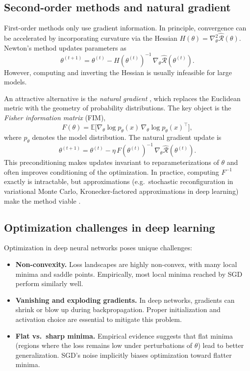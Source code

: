 \subsection{Second-order methods and natural gradient}
First-order methods only use gradient information. In principle, convergence can be 
accelerated by incorporating curvature via the Hessian 
$H(\theta)=\nabla^2_\theta \hat{\mathcal{R}}(\theta)$.  
Newton’s method updates parameters as
\begin{equation}
  \theta^{(t+1)} = \theta^{(t)} - H(\theta^{(t)})^{-1}\,\nabla_\theta \hat{\mathcal{R}}(\theta^{(t)}).
\end{equation}
However, computing and inverting the Hessian is usually infeasible for large models.  

An attractive alternative is the \emph{natural gradient} \cite{Amari1998-NaturalGradient,AmariDouglas1998-WhyNaturalGradient}, which replaces the Euclidean 
metric with the geometry of probability distributions. The key object is the 
\emph{Fisher information matrix} (FIM),
\begin{equation}
  F(\theta) = \mathbb{E}\big[ \nabla_\theta \log p_\theta(x)\,\nabla_\theta \log p_\theta(x)^\top \big],
\end{equation}
where $p_\theta$ denotes the model distribution. The natural gradient update is
\begin{equation}
  \theta^{(t+1)} = \theta^{(t)} - \eta\, F(\theta^{(t)})^{-1}\,\nabla_\theta \hat{\mathcal{R}}(\theta^{(t)}).
\end{equation}
This preconditioning makes updates invariant to reparameterizations of $\theta$ 
and often improves conditioning of the optimization. In practice, computing 
$F^{-1}$ exactly is intractable, but approximations (e.g.\ stochastic reconfiguration 
in variational Monte Carlo, Kronecker-factored approximations in deep learning) 
make the method viable \cite{Pfau2020-FermiNet}. 

\subsection{Optimization challenges in deep learning}
Optimization in deep neural networks poses unique challenges:
\begin{itemize}
  \item \textbf{Non-convexity.} Loss landscapes are highly non-convex, with many local minima 
  and saddle points. Empirically, most local minima reached by SGD perform similarly well.  

  \item \textbf{Vanishing and exploding gradients.} In deep networks, gradients can shrink 
  or blow up during backpropagation. Proper initialization and activation choice are 
  essential to mitigate this problem.  

  \item \textbf{Flat vs.\ sharp minima.} Empirical evidence suggests that flat minima 
  (regions where the loss remains low under perturbations of $\theta$) lead to 
  better generalization. SGD’s noise implicitly biases optimization toward flatter minima.  
\end{itemize}

